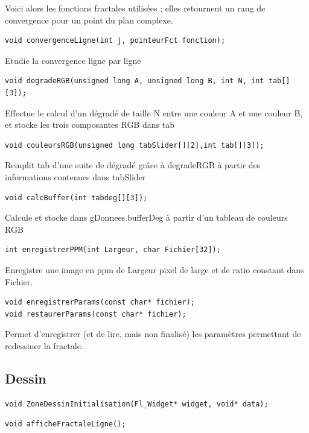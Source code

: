 \documentclass[a4paper,11pt]{article} \usepackage[T1]{fontenc} \usepackage[utf8]{inputenc} \usepackage[francais]{babel}
\begin{document}
Voici alors les fonctions fractales utilisées ; elles retournent un rang de convergence pour un point du plan complexe.


\begin{lstlisting}
void convergenceLigne(int j, pointeurFct fonction);\end{lstlisting}

Etudie la convergence ligne par ligne

\begin{lstlisting}
void degradeRGB(unsigned long A, unsigned long B, int N, int tab[][3]);\end{lstlisting} 

Effectue le calcul d'un dégradé de taille N entre une couleur A et une couleur B, et stocke les trois composantes RGB dans tab

\begin{lstlisting}
void couleursRGB(unsigned long tabSlider[][2],int tab[][3]);\end{lstlisting}

Remplit tab d'une suite de dégradé grâce à degradeRGB à partir des informations contenues dans tabSlider

\begin{lstlisting}
void calcBuffer(int tabdeg[][3]);\end{lstlisting}

Calcule et stocke dans gDonnees.bufferDeg à partir d'un tableau de couleurs RGB

\begin{lstlisting}
int enregistrerPPM(int Largeur, char Fichier[32]);\end{lstlisting}

Enregistre une image en ppm de Largeur pixel de large et de ratio constant dans Fichier.

\begin{lstlisting}
void enregistrerParams(const char* fichier);
void restaurerParams(const char* fichier);\end{lstlisting}

Permet d'enregistrer (et de lire, mais non finalisé) les paramètres permettant de redessiner la fractale.\\

\subsection{Dessin}
\begin{lstlisting}
void ZoneDessinInitialisation(Fl_Widget* widget, void* data);\end{lstlisting}
\begin{lstlisting}
void afficheFractaleLigne();\end{lstlisting}
\end{document}
